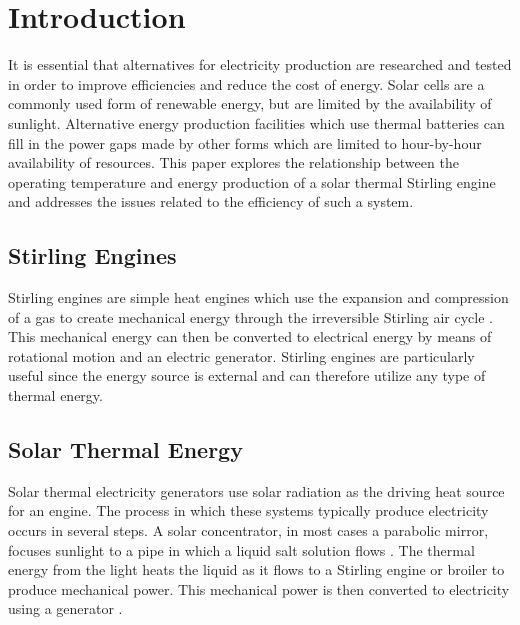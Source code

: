 \chapter{Introduction}

It is essential that alternatives for electricity production are researched and tested in order to improve efficiencies and reduce the cost of energy. Solar cells are a commonly used form of renewable energy, but are limited by the availability of sunlight. Alternative energy production facilities which use thermal batteries can fill in the power gaps made by other forms which are limited to hour-by-hour availability of resources. This paper explores the relationship between the operating temperature and energy production of a solar thermal Stirling engine and addresses the issues related to the efficiency of such a system.

\section{Stirling Engines}

    Stirling engines are simple heat engines which use the expansion and compression of a gas to create mechanical energy through the irreversible Stirling air cycle \cite{ataer}\cite{chen}. This mechanical energy can then be converted to electrical energy by means of rotational motion and an electric generator. Stirling engines are particularly useful since the energy source is external and can therefore utilize any type of thermal energy.

\section{Solar Thermal Energy}

    Solar thermal electricity generators use solar radiation as the driving heat source for an engine. The process in which these systems typically produce electricity occurs in several steps. A solar concentrator, in most cases a parabolic mirror, focuses sunlight to a pipe in which a liquid salt solution flows \cite{eia:01}. The thermal energy from the light heats the liquid as it flows to a Stirling engine or broiler to produce mechanical power. This mechanical power is then converted to electricity using a generator \cite{ataer}.
    
